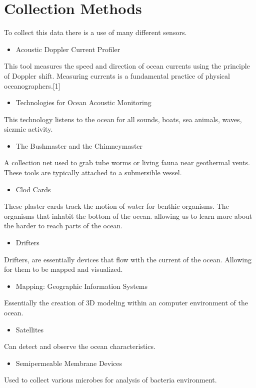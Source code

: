 \documentclass[sigconf]{acmart}
\begin{document}
\section{Collection Methods}
To collect this data there is a use of many different sensors.
\begin{itemize}
\item Acoustic Doppler Current Profiler
\end{itemize}
This tool measures the speed and direction of ocean currents using the principle of Doppler shift. Measuring currents is a fundamental practice of physical oceanographers.[1]
\begin{itemize}
\item Technologies for Ocean Acoustic Monitoring
\end{itemize} 
This technology listens to the ocean for all sounds, boats, sea animals, waves, siezmic activity. 
\begin{itemize}
\item The Bushmaster and the Chimneymaster
\end{itemize}
A collection net used to grab tube worms or living fauna near geothermal vents.  These tools are typically attached to a submersible vessel.
\begin{itemize}
\item Clod Cards
\end{itemize}
These plaster cards track the motion of water for benthic organisms.  The organisms that inhabit the bottom of the ocean.  allowing us to learn more about the harder to reach parts of the ocean.
\begin{itemize}
\item Drifters
\end{itemize}
Drifters, are essentially devices that flow with the current of the ocean.  Allowing for them to be mapped and visualized.
\begin{itemize}
\item Mapping: Geographic Information Systems
\end{itemize}
Essentially the creation of 3D modeling within an computer environment of the ocean.
\begin{itemize}
\item Satellites
\end{itemize}
Can detect and observe the ocean characteristics.
\begin{itemize}
\item Semipermeable Membrane Devices
\end{itemize}
Used to collect various microbes for analysis of bacteria environment.
\end{document}

